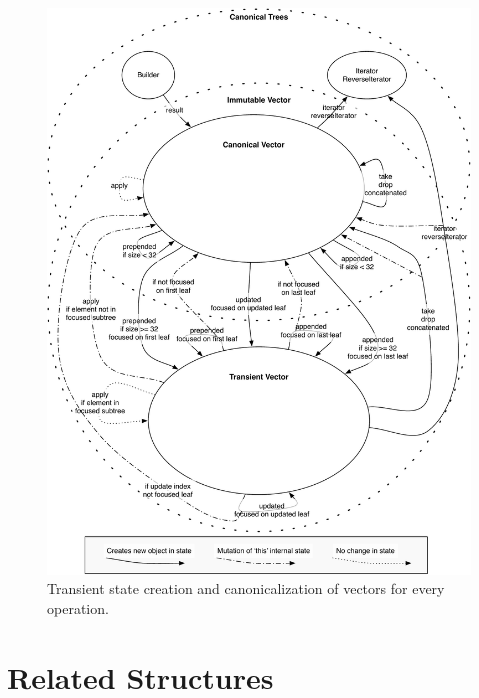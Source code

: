 \begin{figure}[h!]
  \centering
  \includegraphics[width=\textwidth]{Figures/StatesGraph}
  \caption{Transient state creation and canonicalization of vectors for every operation.}
  \label{StatesGraphComplete}
\end{figure}

\clearpage
\section{Related Structures}
\label{OptimizationRelatedStructures}


